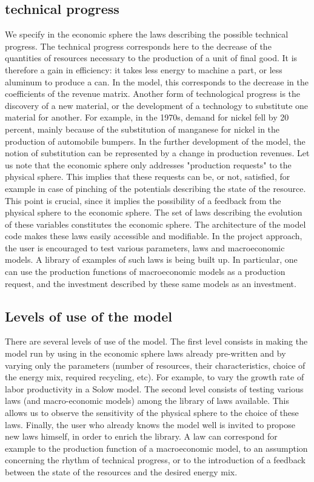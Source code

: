 \documentclass[12pt,a4paper]{article}%
\begin{document}
\begin{appendix}
\subsection{{technical progress}}  
We specify in the economic sphere the laws describing the possible technical progress. The technical progress corresponds here to the decrease of the quantities of resources necessary to the production of a unit of final good. It is therefore a gain in efficiency: it takes less energy to machine a part, or less aluminum to produce a can. In the model, this corresponds to the decrease in the coefficients of the revenue matrix. Another form of technological progress is the discovery of a new material, or the development of a technology to substitute one material for another. For example, in the 1970s, demand for nickel fell by 20 percent, mainly because of the substitution of manganese for nickel in the production of automobile bumpers. In the further development of the model, the notion of substitution can be represented by a change in production revenues. Let us note that the economic sphere only addresses "production requests" to the physical sphere. This implies that these requests can be, or not, satisfied, for example in case of pinching of the potentials describing the state of the resource. This point is crucial, since it implies the possibility of a feedback from the physical sphere to the economic sphere. The set of laws describing the evolution of these variables constitutes the economic sphere. The architecture of the model code makes these laws easily accessible and modifiable. In the project approach, the user is encouraged to test various parameters, laws and macroeconomic models. A library of examples of such laws is being built up. In particular, one can use the production functions of macroeconomic models as a production request, and the investment described by these same models as an investment.  

\subsection{Levels of use of the model}
There are several levels of use of the model. The first level consists in making the model run by using in the economic sphere laws already pre-written and by varying only the parameters (number of resources, their characteristics, choice of the energy mix, required recycling, etc). For example, to vary the growth rate of labor productivity in a Solow model.  The second level consists of testing various laws (and macro-economic models) among the library of laws available. This allows us to observe the sensitivity of the physical sphere to the choice of these laws.  Finally, the user who already knows the model well is invited to propose new laws himself, in order to enrich the library. A law can correspond for example to the production function of a macroeconomic model, to an assumption concerning the rhythm of technical progress, or to the introduction of a feedback between the state of the resources and the desired energy mix.


\end{appendix}
\end{document}
